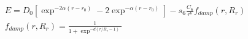 \documentclass[12pt,fleqn]{article}
\begin{document}
\setlength{\jot}{2ex}
\begin{gather*}
  E = D_0 [\exp^{-2 \alpha (r-r_0)} - 2\exp^{-\alpha (r-r_0)}] - s_6 \frac{C_6}{r^6} f_{damp}(r,R_r) \\
  f_{damp}(r,R_r) = \frac{1}{1 + \exp^{-d(r/R_r - 1)}}
\end{gather*}
\end{document}
